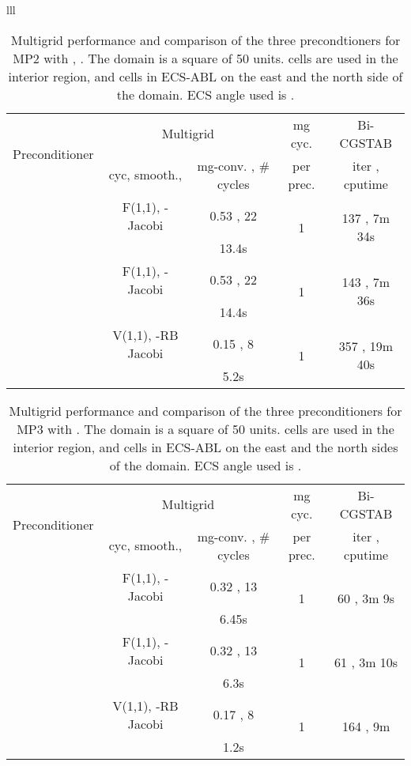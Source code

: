 \documentclass[mathpazo]{cicp}
\theoremstyle{definition}
\numberwithin{equation}{section}
\begin{document}
\begin{algorithm}
\begin{enumerate}
\begin{tabular}{lll}
\begin{table}
 \begin{tabular}{|c|c|c|c|c|} \hline 
  \multirow{2}{*}{Preconditioner} & \multicolumn{2}{c|}{Multigrid} & mg cyc. & Bi-CGSTAB\\ \cline{2-3}
 & cyc, smooth.,  & mg-conv. , \# cycles & per prec. & iter , cputime \\ \hline
 & F(1,1), -Jacobi & 0.53 , 22 & \multirow{2}{*}{1} & \multirow{2}{*}{137 , 7m 34s}\\
 &  & 13.4s & & \\ \hline
 & F(1,1), -Jacobi & 0.53 , 22 & \multirow{2}{*}{1} & \multirow{2}{*}{143 , 7m 36s}\\
 &  & 14.4s & & \\ \hline
 & V(1,1), -RB Jacobi & 0.15 , 8 & \multirow{2}{*}{1} & \multirow{2}{*}{357 , 19m 40s}\\
 &  & 5.2s & & \\ \hline
 \end{tabular}
\caption{Multigrid performance and comparison of the three precondtioners for MP2 with , . The domain is a square of 50 units.  cells are used in the interior region, and  cells in ECS-ABL on the east and the north side of the domain. ECS angle used is .}
\label{tab:exp2}
\end{table}

\begin{table}[!h]
 \begin{tabular}{|c|c|c|c|c|} \hline 
  \multirow{2}{*}{Preconditioner} & \multicolumn{2}{c|}{Multigrid} & mg cyc. & Bi-CGSTAB\\ \cline{2-3}
 & cyc, smooth.,  & mg-conv. , \# cycles & per prec. & iter , cputime \\ \hline
 & F(1,1), -Jacobi & 0.32 , 13 & \multirow{2}{*}{1} & \multirow{2}{*}{60 , 3m 9s}\\
 &  & 6.45s & & \\ \hline
 & F(1,1), -Jacobi & 0.32 , 13 & \multirow{2}{*}{1} & \multirow{2}{*}{61 , 3m 10s}\\
 &  & 6.3s & & \\ \hline
 & V(1,1), -RB Jacobi & 0.17 , 8 & \multirow{2}{*}{1} & \multirow{2}{*}{164 , 9m}\\
 &  & 1.2s & & \\ \hline
 \end{tabular}
\caption{Multigrid performance and comparison of the three preconditioners for MP3 with . The domain is a square of 50 units.  cells are used in the interior region, and  cells in ECS-ABL on the east and the north sides of the domain. ECS angle used is .}
\label{tab:exp3}
\end{table}


\end{tabular}
\end{enumerate}
\end{algorithm}
\end{document}
